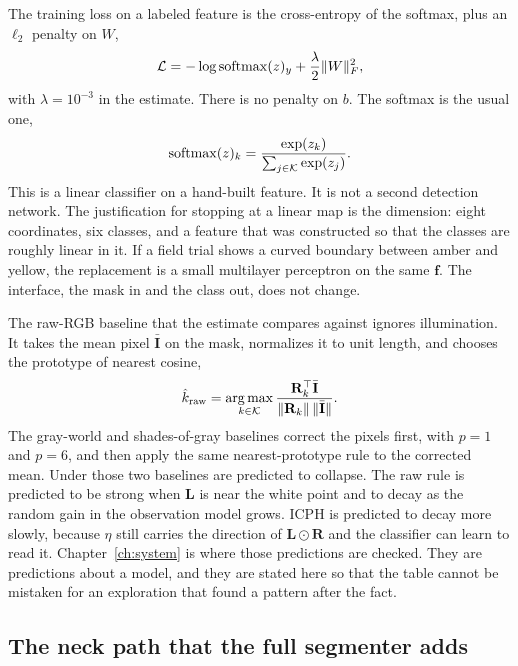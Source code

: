 The training loss on a labeled feature is the cross-entropy of the softmax, plus an $\ell_2$ penalty on $W$,
\begin{equation}
\mathcal{L}
= -\log \operatorname{softmax}(z)_{y}
+ \frac{\lambda}{2}\lVert W\rVert_{F}^{2},
\label{eq:loss}
\end{equation}
with $\lambda=10^{-3}$ in the estimate. There is no penalty on $b$. The softmax is the usual one,
\begin{equation}
\operatorname{softmax}(z)_k
= \frac{\exp(z_k)}{\sum_{j\in\mathcal{K}}\exp(z_j)}.
\label{eq:softmax}
\end{equation}
This is a linear classifier on a hand-built feature. It is not a second detection network. The justification for stopping at a linear map is the dimension: eight coordinates, six classes, and a feature that was constructed so that the classes are roughly linear in it. If a field trial shows a curved boundary between amber and yellow, the replacement is a small multilayer perceptron on the same $\mathbf{f}$. The interface, the mask in and the class out, does not change.

The raw-RGB baseline that the estimate compares against ignores illumination. It takes the mean pixel $\bar{\mathbf{I}}$ on the mask, normalizes it to unit length, and chooses the prototype of nearest cosine,
\begin{equation}
\hat{k}_{\text{raw}}
= \operatorname*{arg\,max}_{k\in\mathcal{K}}
\frac{\mathbf{R}_{k}^{\top}\bar{\mathbf{I}}}{\lVert\mathbf{R}_{k}\rVert\,\lVert\bar{\mathbf{I}}\rVert}.
\label{eq:raw}
\end{equation}
The gray-world and shades-of-gray baselines correct the pixels first, with $p=1$ and $p=6$, and then apply the same nearest-prototype rule to the corrected mean. Under  those two baselines are predicted to collapse. The raw rule is predicted to be strong when $\mathbf{L}$ is near the white point and to decay as the random gain in the observation model grows. ICPH is predicted to decay more slowly, because $\eta$ still carries the direction of $\mathbf{L}\odot\mathbf{R}$ and the classifier can learn to read it. Chapter~\ref{ch:system} is where those predictions are checked. They are predictions about a model, and they are stated here so that the table cannot be mistaken for an exploration that found a pattern after the fact.

\subsection{The neck path that the full segmenter adds}
\label{sec:icph-neck}


